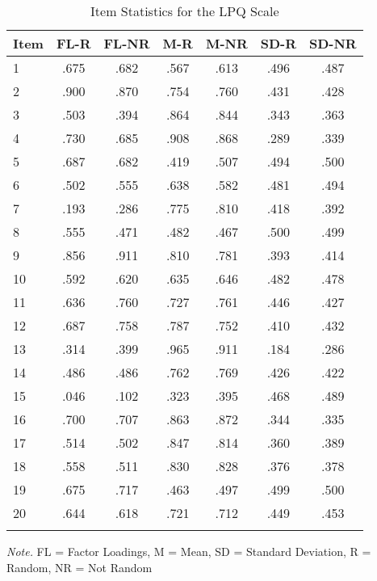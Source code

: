 \documentclass[english,man]{apa6}
\theoremstyle{definition}
\theoremstyle{definition}
\theoremstyle{definition}
\theoremstyle{remark}
\begin{document}
\begin{table}[tbp]
\begin{center}
\begin{threeparttable}
\caption{\label{tab:Ltable}Item Statistics for the LPQ Scale}
\begin{tabular}{lcccccc}
\toprule
Item & \multicolumn{1}{c}{FL-R} & \multicolumn{1}{c}{FL-NR} & \multicolumn{1}{c}{M-R} & \multicolumn{1}{c}{M-NR} & \multicolumn{1}{c}{SD-R} & \multicolumn{1}{c}{SD-NR}\\
\midrule
1 & .675 & .682 & .567 & .613 & .496 & .487\\
2 & .900 & .870 & .754 & .760 & .431 & .428\\
3 & .503 & .394 & .864 & .844 & .343 & .363\\
4 & .730 & .685 & .908 & .868 & .289 & .339\\
5 & .687 & .682 & .419 & .507 & .494 & .500\\
6 & .502 & .555 & .638 & .582 & .481 & .494\\
7 & .193 & .286 & .775 & .810 & .418 & .392\\
8 & .555 & .471 & .482 & .467 & .500 & .499\\
9 & .856 & .911 & .810 & .781 & .393 & .414\\
10 & .592 & .620 & .635 & .646 & .482 & .478\\
11 & .636 & .760 & .727 & .761 & .446 & .427\\
12 & .687 & .758 & .787 & .752 & .410 & .432\\
13 & .314 & .399 & .965 & .911 & .184 & .286\\
14 & .486 & .486 & .762 & .769 & .426 & .422\\
15 & .046 & .102 & .323 & .395 & .468 & .489\\
16 & .700 & .707 & .863 & .872 & .344 & .335\\
17 & .514 & .502 & .847 & .814 & .360 & .389\\
18 & .558 & .511 & .830 & .828 & .376 & .378\\
19 & .675 & .717 & .463 & .497 & .499 & .500\\
20 & .644 & .618 & .721 & .712 & .449 & .453\\
\bottomrule
\addlinespace
\end{tabular}
\begin{tablenotes}[para]
\textit{Note.} FL = Factor Loadings, M = Mean, SD = Standard Deviation, R = Random, NR = Not Random
\end{tablenotes}
\end{threeparttable}
\end{center}
\end{table}
\end{document}

